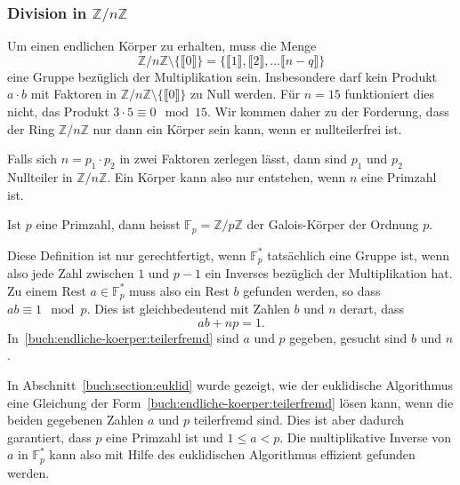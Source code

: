\subsubsection{Division in $\mathbb{Z}/n\mathbb{Z}$}
Um einen endlichen Körper zu erhalten, muss die Menge
\[
\mathbb{Z}/n\mathbb{Z} \setminus \{\llbracket0\rrbracket\}
=
\{
\llbracket 1\rrbracket,
\llbracket 2\rrbracket,
\dots
\llbracket n-q\rrbracket
\}
\]
eine Gruppe bezüglich der Multiplikation sein.
Insbesondere darf kein Produkt $a\cdot b$ mit Faktoren in 
$\mathbb{Z}/n\mathbb{Z} \setminus \{\llbracket0\rrbracket\}$
zu Null werden.
Für $n=15$ funktioniert dies nicht, das Produkt $3\cdot 5\equiv 0\mod 15$.
Wir kommen daher zu der Forderung, dass der Ring $\mathbb{Z}/n\mathbb{Z}$ 
nur dann ein Körper sein kann, wenn er nullteilerfrei ist.

Falls sich $n=p_1\cdot p_2$ in zwei Faktoren zerlegen lässt, dann sind
$p_1$ und $p_2$ Nullteiler in $\mathbb{Z}/n\mathbb{Z}$.
Ein Körper kann also nur entstehen, wenn $n$ eine Primzahl ist.

\begin{definition}
\label{buch:endlichekoerper:def:galois-koerper}
Ist $p$ eine Primzahl, dann heisst $\mathbb{F}_p=\mathbb{Z}/p\mathbb{Z}$
%
der Galois-Körper der Ordnung $p$.
%
\end{definition}

Diese Definition ist nur gerechtfertigt, wenn $\mathbb{F}_p^*$ tatsächlich
eine Gruppe ist, wenn also jede Zahl zwischen $1$ und $p-1$ ein Inverses
bezüglich der Multiplikation hat.
Zu einem Rest $a\in\mathbb{F}_p^*$ muss also ein Rest $b$ gefunden werden,
so dass $ab\equiv 1\mod p$.
Dies ist gleichbedeutend mit Zahlen $b$ und $n$ derart, dass
\begin{equation}
ab+np=1.
\label{buch:endliche-koerper:teilerfremd}
\end{equation}
In~\eqref{buch:endliche-koerper:teilerfremd} sind $a$ und $p$ gegeben,
gesucht sind $b$ und $n$.

In Abschnitt~\ref{buch:section:euklid} wurde gezeigt, wie der euklidische
Algorithmus eine Gleichung der Form~\eqref{buch:endliche-koerper:teilerfremd}
lösen kann, wenn die beiden gegebenen Zahlen $a$ und $p$ teilerfremd sind.
Dies ist aber dadurch garantiert, dass $p$ eine Primzahl ist und $1\le a <p$.
Die multiplikative Inverse von $a$ in $\mathbb{F}_p^*$ kann also mit
Hilfe des euklidischen Algorithmus effizient gefunden werden.
%

